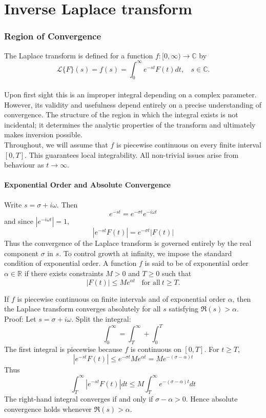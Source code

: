 \chapter{Inverse Laplace transform}\label{Sec3.2}
\subsection{Region of Convergence}\label{4.0.1}

The Laplace transform is defined for a function $f:[0,\infty) \rightarrow \mathbb{C}$ by $$\mathcal{L} \{F\}(s)= f(s)=\int^{\infty}_{0}e^{-st}F(t)dt, \ \ \ \ s\in\mathbb{C}.$$
\\
Upon first sight this is an improper integral depending on a complex parameter. However, its validity and usefulness depend entirely on a precise understanding of convergence. The structure of the region in which the integral exists is not incidental; it determines the analytic properties of the transform and ultimately makes inversion possible.
\\
Throughout, we will assume that $f$ is piecewise continuous on every finite interval $[0,T]$. This guarantees local integrability. All non-trivial issues arise from behaviour as $t\rightarrow \infty$.
\\
\subsubsection{Exponential Order and Absolute Convergence}
Write $s=\sigma+i\omega$. Then $$e^{-st}=e^{-\sigma t}e^{-i\omega t}$$ and since $|e^{-i\omega t}|=1,$ $$|e^{-st}F(t)|=e^{-\sigma t}|F(t)|$$ Thus the convergence of the Laplace transform is governed entirely by the real component $\sigma$ in $s$. To control growth at infinity, we impose the standard condition of exponential order. A function $f$ is said to be of exponential order $\alpha \in \mathbb{R}$ if there exists constraints $M>0$ and $T\geq0$ such that $$|F(t)|\leq Me^{\alpha t} \ \ \ \ \text{for all} \ t\geq T. $$ 

\begin{theorem}
    If $f$ is piecewise continuous on finite intervals and of exponential order $\alpha$, then the Laplace transform converges absolutely for all $s$ satisfying $\Re(s)>\alpha$.
    \\
    Proof: Let $s=\sigma+i\omega$. Split the integral: $$\int^{\infty}_{0}=\int^{\infty}_{T}+\int^{T}_{0}$$The first integral is piecewise because $f$ is continuous on $[0,T]$. For $t\geq T$, $$|e^{-st}F(t)|\leq e^{-\sigma t}Me^{\alpha t}= Me^{-(\sigma-\alpha)t}$$ Thus $$\int^{\infty}_{T}|e^{-st}F(t)|dt\leq M\int^{\infty}_{T}e^{-(\sigma -\alpha)t}dt$$ The right-hand integral converges if and only if $\sigma-\alpha>0$. Hence absolute convergence holds whenever $\Re (s)>\alpha$.
\end{theorem} \cite{YellowBook,ThousandPage,widder1941}

